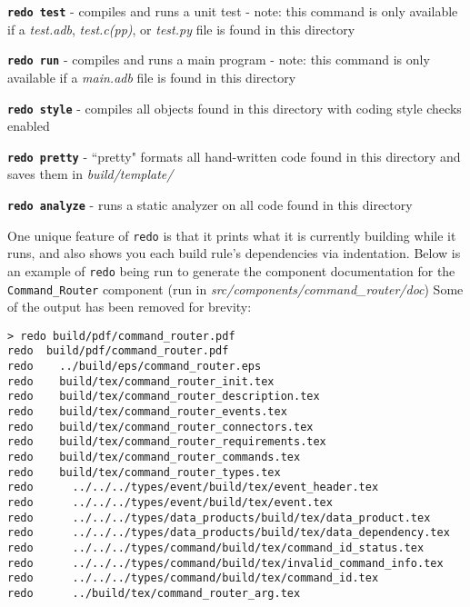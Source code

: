 \begin{spaceditemize}
  \item \textbf{\texttt{redo test}} - compiles and runs a unit test - note: this command is only available if a \textit{test.adb}, \textit{test.c(pp)}, or \textit{test.py} file is found in this directory
  \item \textbf{\texttt{redo run}} - compiles and runs a main program - note: this command is only available if a \textit{main.adb} file is found in this directory
  \item \textbf{\texttt{redo style}} - compiles all objects found in this directory with coding style checks enabled
  \item \textbf{\texttt{redo pretty}} - ``pretty" formats all hand-written code found in this directory and saves them in \textit{build/template/}
  \item \textbf{\texttt{redo analyze}} - runs a static analyzer on all code found in this directory
\end{spaceditemize}
\vspace{5mm} %

One unique feature of \texttt{redo} is that it prints what it is currently building while it runs, and also shows you each build rule's dependencies via indentation. Below is an example of \texttt{redo} being run to generate the component documentation for the \texttt{Command\_Router} component (run in \textit{src/components/command\_router/doc}) Some of the output has been removed for brevity:

\vspace{5mm} %
\begin{verbatim}
> redo build/pdf/command_router.pdf
redo  build/pdf/command_router.pdf
redo    ../build/eps/command_router.eps
redo    build/tex/command_router_init.tex
redo    build/tex/command_router_description.tex
redo    build/tex/command_router_events.tex
redo    build/tex/command_router_connectors.tex
redo    build/tex/command_router_requirements.tex
redo    build/tex/command_router_commands.tex
redo    build/tex/command_router_types.tex
redo      ../../../types/event/build/tex/event_header.tex
redo      ../../../types/event/build/tex/event.tex
redo      ../../../types/data_products/build/tex/data_product.tex
redo      ../../../types/data_products/build/tex/data_dependency.tex
redo      ../../../types/command/build/tex/command_id_status.tex
redo      ../../../types/command/build/tex/invalid_command_info.tex
redo      ../../../types/command/build/tex/command_id.tex
redo      ../build/tex/command_router_arg.tex
\end{verbatim}
\vspace{5mm} %


